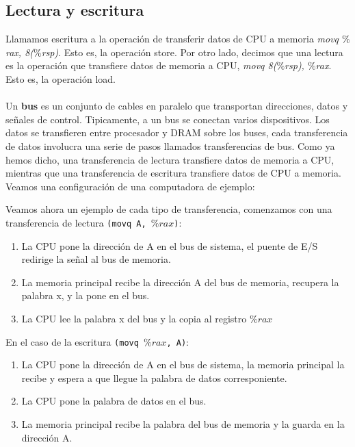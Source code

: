 \subsection{Lectura y escritura}
Llamamos escritura a la operación de transferir datos de CPU a memoria \textit{movq $\%$rax, 8($\%$rsp)}. Esto es, 
la operación store. Por otro lado, decimos que una lectura es la operación que transfiere datos de memoria a CPU, 
\textit{movq 8($\%$rsp), $\%$rax}. Esto es, la operación load.
\\ \\ 
Un \textbf{bus} es un conjunto de cables en paralelo que transportan direcciones, datos y señales de control. Tipicamente, 
a un bus se conectan varios dispositivos. Los datos se transfieren entre procesador y DRAM sobre los buses, cada transferencia 
de datos involucra una serie de pasos llamados transferencias de bus. Como ya hemos dicho, una transferencia de lectura transfiere datos de memoria a CPU, 
mientras que una transferencia de escritura transfiere datos de CPU a memoria. Veamos una configuración de una computadora de ejemplo:
\begin{center}
    
\end{center}
Veamos ahora un ejemplo de cada tipo de transferencia, comenzamos con una transferencia de lectura \texttt{(movq A, $\%rax$)}:
\begin{enumerate}
    \item La CPU pone la dirección de A en el bus de sistema, el puente de E/S redirige la señal al bus de memoria.
    \item La memoria principal recibe la dirección A del bus de memoria, recupera la palabra x, y la pone en el bus.
    \item La CPU lee la palabra x del bus y la copia al registro $\%rax$
\end{enumerate}
En el caso de la escritura \texttt{(movq $\%rax$, A)}:
\begin{enumerate}
    \item La CPU pone la dirección de A en el bus de sistema, la memoria principal la recibe y espera a que llegue la palabra de datos  
        corresponiente.
    \item La CPU pone la palabra de datos en el bus. 
    \item La memoria principal recibe la palabra del bus de memoria y la guarda en la dirección A.
\end{enumerate}
